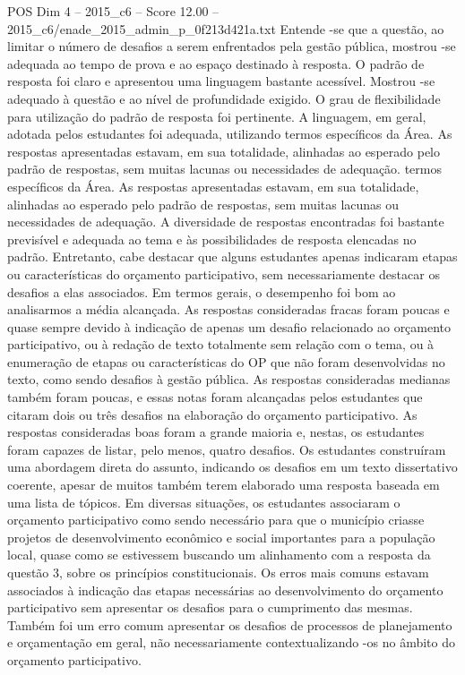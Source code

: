 \begin{textsample}{POS Dim 4 – 2015\_c6 – Score 12.00 – 2015\_c6/enade\_2015\_admin\_p\_0f213d421a.txt}
Entende -se que a questão, ao limitar o número de desafios a serem enfrentados pela gestão pública, mostrou -se adequada ao tempo de prova e ao espaço destinado à resposta.
O padrão de resposta foi claro e apresentou uma linguagem bastante acessível.
Mostrou -se adequado à questão e ao nível de profundidade exigido.
O grau de flexibilidade para utilização do padrão de resposta foi pertinente.
A linguagem, em geral, adotada pelos estudantes foi adequada, utilizando termos específicos da Área.
As respostas apresentadas estavam, em sua totalidade, alinhadas ao esperado pelo padrão de respostas, sem muitas lacunas ou necessidades de adequação. termos específicos da Área.
As respostas apresentadas estavam, em sua totalidade, alinhadas ao esperado pelo padrão de respostas, sem muitas lacunas ou necessidades de adequação.
A diversidade de respostas encontradas foi bastante previsível e adequada ao tema e às possibilidades de resposta elencadas no padrão.
Entretanto, cabe destacar que alguns estudantes apenas indicaram etapas ou características do orçamento participativo, sem necessariamente destacar os desafios a elas associados.
Em termos gerais, o desempenho foi bom ao analisarmos a média alcançada.
As respostas consideradas fracas foram poucas e quase sempre devido à indicação de apenas um desafio relacionado ao orçamento participativo, ou à redação de texto totalmente sem relação com o tema, ou à enumeração de etapas ou características do OP que não foram desenvolvidas no texto, como sendo desafios à gestão pública.
As respostas consideradas medianas também foram poucas, e essas notas foram alcançadas pelos estudantes que citaram dois ou três desafios na elaboração do orçamento participativo.
As respostas consideradas boas foram a grande maioria e, nestas, os estudantes foram capazes de listar, pelo menos, quatro desafios.
Os estudantes construíram uma abordagem direta do assunto, indicando os desafios em um texto dissertativo coerente, apesar de muitos também terem elaborado uma resposta baseada em uma lista de tópicos.
Em diversas situações, os estudantes associaram o orçamento participativo como sendo necessário para que o município criasse projetos de desenvolvimento econômico e social importantes para a população local, quase como se estivessem buscando um alinhamento com a resposta da questão 3, sobre os princípios constitucionais.
Os erros mais comuns estavam associados à indicação das etapas necessárias ao desenvolvimento do orçamento participativo sem apresentar os desafios para o cumprimento das mesmas.
Também foi um erro comum apresentar os desafios de processos de planejamento e orçamentação em geral, não necessariamente contextualizando -os no âmbito do orçamento participativo.

\end{textsample}
